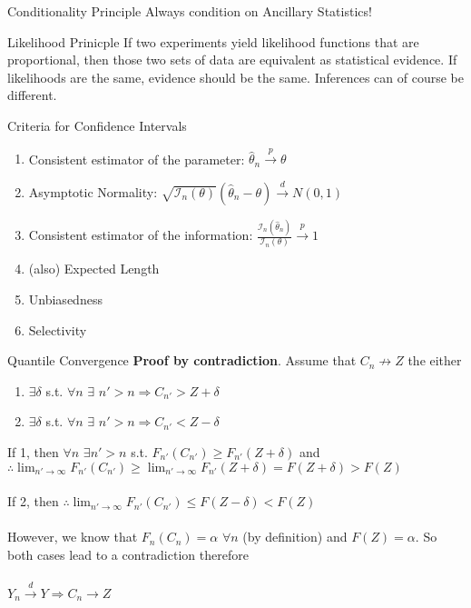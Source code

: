 \documentclass[avery5388,grid,frame]{flashcards}
\begin{document}
\begin{flashcard}{Conditionality Principle}
\bigskip\bigskip\bigskip\bigskip
Always condition on Ancillary Statistics!
\end{flashcard}
\begin{flashcard}{Likelihood Prinicple}
\bigskip\bigskip\bigskip\bigskip
If two experiments yield likelihood functions that are proportional, then those two sets of data are equivalent as statistical evidence. If likelihoods are the same, evidence should be the same. Inferences can of course be different.
\end{flashcard}
\begin{flashcard}[Definition]{Criteria for Confidence Intervals}
\bigskip\bigskip
\begin{enumerate}
\item Consistent estimator of the parameter: $\hat{\theta}_n\overset{p}{\rightarrow}\theta$
\item Asymptotic Normality: $\sqrt{\mathcal{I}_n(\theta)}(\hat{\theta}_n-\theta)\overset{d}{\rightarrow}N(0,1)$
\item Consistent estimator of the information: $\frac{\mathcal{I}_n(\hat{\theta}_n)}{\mathcal{I}_n(\theta)}\overset{p}{\rightarrow}1$
\item (also) Expected Length 
\item Unbiasedness
\item Selectivity
\end{enumerate}
\end{flashcard}
\begin{flashcard}[Proof]{Quantile Convergence}
\bigskip
\textbf{Proof by contradiction}. Assume that $C_n\not\rightarrow Z$ the either
\begin{enumerate}
\item $\exists\delta$ s.t. $\forall n$ $\exists$ $n'>n\Rightarrow C_{n'}>Z+\delta$
\item $\exists\delta$ s.t. $\forall n$ $\exists$ $n'>n\Rightarrow C_{n'}<Z-\delta$
\end{enumerate}
If 1, then $\forall n$ $\exists n'>n$ s.t. $F_{n'}(C_{n'})\geq F_{n'}(Z+\delta)$ and \\
$\therefore \lim_{n'\rightarrow\infty} F_{n'}(C_{n'})\geq\lim_{n'\rightarrow\infty}F_{n'}(Z+\delta)=F(Z+\delta)>F(Z)$\\\\
If 2, then $\therefore \lim_{n'\rightarrow\infty} F_{n'}(C_{n'})\leq F(Z-\delta)<F(Z)$\\\\
However, we know that $F_n(C_n)=\alpha$ $\forall n$ (by definition) and $F(Z)=\alpha$. So both cases lead to a contradiction therefore \\\\$Y_n\overset{d}{\rightarrow}Y\Rightarrow C_n\rightarrow Z$
\end{flashcard}
\end{document}
